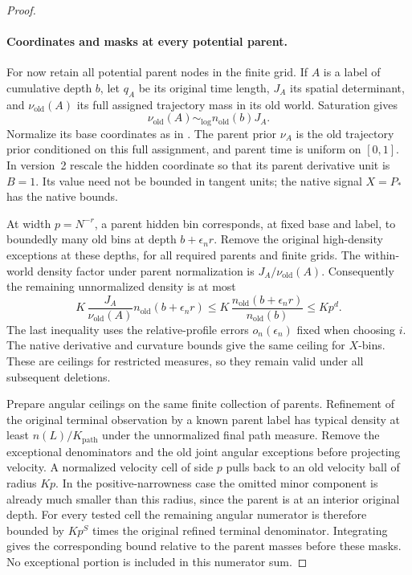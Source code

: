 \begin{proof}
\leavevmode\par
\paragraph{Coordinates and masks at every potential parent.}
For now retain all potential parent nodes in the finite grid.  If \(A\)
is a label of cumulative depth \(b\), let \(q_A\) be its original time
length, \(J_A\) its spatial determinant, and
\(\nu_{\mathrm{old}}(A)\) its full assigned trajectory mass in its
old world.  Saturation gives
\[
 \nu_{\mathrm{old}}(A)
 \sim_{\log} n_{\mathrm{old}}(b)J_A.
\]
Normalize its base coordinates as in .  The
parent prior \(\nu_A\) is the old trajectory prior conditioned on
this full assignment, and parent time is uniform on \([0,1]\).
In version~2 rescale the hidden coordinate so that its parent derivative
unit is \(B=1\).  Its value need not be bounded in tangent units; the
native signal \(X=P_*\) has the native bounds.

At width \(p=N^{-r}\), a parent hidden bin corresponds, at fixed base
and label, to boundedly many old bins at depth \(b+\epsilon_n r\).
Remove the original high-density exceptions at these depths, for all
required parents and finite grids.  The within-world density factor
under parent normalization is \(J_A/\nu_{\mathrm{old}}(A)\).
Consequently the remaining unnormalized density is at most
\[
 K\,\frac{J_A}{\nu_{\mathrm{old}}(A)}
       n_{\mathrm{old}}(b+\epsilon_n r)
 \le K\,\frac{n_{\mathrm{old}}(b+\epsilon_n r)}
                 {n_{\mathrm{old}}(b)}
 \le Kp^d.
\]
The last inequality uses the relative-profile errors
\(o_n(\epsilon_n)\) fixed when choosing \(i\).  The native derivative
and curvature bounds give the same ceiling for \(X\)-bins.  These
are ceilings for restricted measures, so they remain valid under all
subsequent deletions.

Prepare angular ceilings on the same finite collection of parents.
Refinement of the original terminal observation by a known parent label
has typical density at least \(n(L)/K_{\mathrm{path}}\) under the
unnormalized final path measure.  Remove the exceptional denominators
and the old joint angular exceptions before projecting velocity.  A
normalized velocity cell of side \(p\) pulls back to an old velocity
ball of radius \(Kp\).  In the positive-narrowness case the omitted
minor component is already much smaller than this radius, since the
parent is at an interior original depth.  For every tested cell the
remaining angular numerator is therefore bounded by \(Kp^S\) times
the original refined terminal denominator.  Integrating gives the
corresponding bound relative to the parent masses before these masks.
No exceptional portion is included in this numerator sum.


\end{proof}
